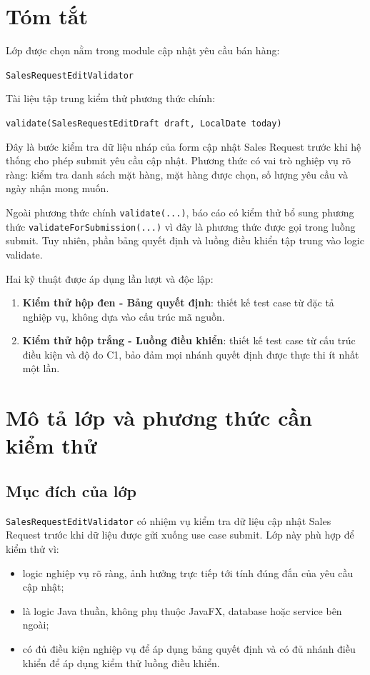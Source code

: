 \documentclass[12pt,a4paper]{article}
\newcommand{\code}[1]{\texttt{#1}}
\begin{document}
\section{Tóm tắt}

Lớp được chọn nằm trong module cập nhật yêu cầu bán hàng:
\begin{tcolorbox}[colback=softgray,colframe=linegray,sharp corners]
\code{SalesRequestEditValidator}
\end{tcolorbox}

Tài liệu tập trung kiểm thử phương thức chính:
\begin{tcolorbox}[colback=softgray,colframe=linegray,sharp corners]
\code{validate(SalesRequestEditDraft draft, LocalDate today)}
\end{tcolorbox}

Đây là bước kiểm tra dữ liệu nháp của form cập nhật Sales Request trước khi hệ thống cho phép submit yêu cầu cập nhật. Phương thức có vai trò nghiệp vụ rõ ràng: kiểm tra danh sách mặt hàng, mặt hàng được chọn, số lượng yêu cầu và ngày nhận mong muốn.

Ngoài phương thức chính \code{validate(...)}, báo cáo có kiểm thử bổ sung phương thức \code{validateForSubmission(...)} vì đây là phương thức được gọi trong luồng submit. Tuy nhiên, phần bảng quyết định và luồng điều khiển tập trung vào logic validate.

Hai kỹ thuật được áp dụng lần lượt và độc lập:
\begin{enumerate}[leftmargin=1.2cm]
  \item \textbf{Kiểm thử hộp đen - Bảng quyết định}: thiết kế test case từ đặc tả nghiệp vụ, không dựa vào cấu trúc mã nguồn.
  \item \textbf{Kiểm thử hộp trắng - Luồng điều khiển}: thiết kế test case từ cấu trúc điều kiện và độ đo C1, bảo đảm mọi nhánh quyết định được thực thi ít nhất một lần.
\end{enumerate}

\section{Mô tả lớp và phương thức cần kiểm thử}

\subsection{Mục đích của lớp}

\code{SalesRequestEditValidator} có nhiệm vụ kiểm tra dữ liệu cập nhật Sales Request trước khi dữ liệu được gửi xuống use case submit. Lớp này phù hợp để kiểm thử vì:
\begin{itemize}[leftmargin=1.1cm]
  \item logic nghiệp vụ rõ ràng, ảnh hưởng trực tiếp tới tính đúng đắn của yêu cầu cập nhật;
  \item là logic Java thuần, không phụ thuộc JavaFX, database hoặc service bên ngoài;
  \item có đủ điều kiện nghiệp vụ để áp dụng bảng quyết định và có đủ nhánh điều khiển để áp dụng kiểm thử luồng điều khiển.
\end{itemize}
\end{document}
